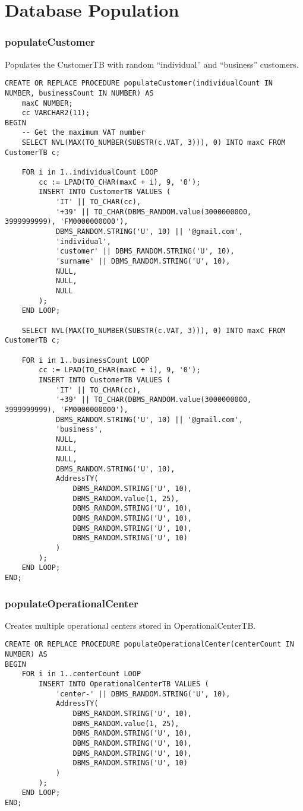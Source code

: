 \chapter{Database Population}

\subsection*{populateCustomer}
Populates the CustomerTB with random “individual” and “business” customers.
\begin{lstlisting}
CREATE OR REPLACE PROCEDURE populateCustomer(individualCount IN NUMBER, businessCount IN NUMBER) AS
    maxC NUMBER;
    cc VARCHAR2(11);
BEGIN
    -- Get the maximum VAT number
    SELECT NVL(MAX(TO_NUMBER(SUBSTR(c.VAT, 3))), 0) INTO maxC FROM CustomerTB c;

    FOR i in 1..individualCount LOOP
        cc := LPAD(TO_CHAR(maxC + i), 9, '0');
        INSERT INTO CustomerTB VALUES (
            'IT' || TO_CHAR(cc),
            '+39' || TO_CHAR(DBMS_RANDOM.value(3000000000, 3999999999), 'FM0000000000'),
            DBMS_RANDOM.STRING('U', 10) || '@gmail.com',
            'individual',
            'customer' || DBMS_RANDOM.STRING('U', 10),
            'surname' || DBMS_RANDOM.STRING('U', 10),
            NULL,
            NULL,
            NULL
        );
    END LOOP;
    
    SELECT NVL(MAX(TO_NUMBER(SUBSTR(c.VAT, 3))), 0) INTO maxC FROM CustomerTB c;
    
    FOR i in 1..businessCount LOOP
        cc := LPAD(TO_CHAR(maxC + i), 9, '0');
        INSERT INTO CustomerTB VALUES (
            'IT' || TO_CHAR(cc),
            '+39' || TO_CHAR(DBMS_RANDOM.value(3000000000, 3999999999), 'FM0000000000'),
            DBMS_RANDOM.STRING('U', 10) || '@gmail.com',
            'business',
            NULL,
            NULL,
            NULL,
            DBMS_RANDOM.STRING('U', 10),
            AddressTY(
                DBMS_RANDOM.STRING('U', 10),
                DBMS_RANDOM.value(1, 25),
                DBMS_RANDOM.STRING('U', 10),
                DBMS_RANDOM.STRING('U', 10),
                DBMS_RANDOM.STRING('U', 10),
                DBMS_RANDOM.STRING('U', 10)
            )
        );
    END LOOP;
END;
\end{lstlisting}

\subsection*{populateOperationalCenter}
Creates multiple operational centers stored in OperationalCenterTB.
\begin{lstlisting}
CREATE OR REPLACE PROCEDURE populateOperationalCenter(centerCount IN NUMBER) AS
BEGIN
    FOR i in 1..centerCount LOOP
        INSERT INTO OperationalCenterTB VALUES (
            'center-' || DBMS_RANDOM.STRING('U', 10),
            AddressTY(
                DBMS_RANDOM.STRING('U', 10),
                DBMS_RANDOM.value(1, 25),
                DBMS_RANDOM.STRING('U', 10),
                DBMS_RANDOM.STRING('U', 10),
                DBMS_RANDOM.STRING('U', 10),
                DBMS_RANDOM.STRING('U', 10)
            )
        );
    END LOOP;
END;
\end{lstlisting}

